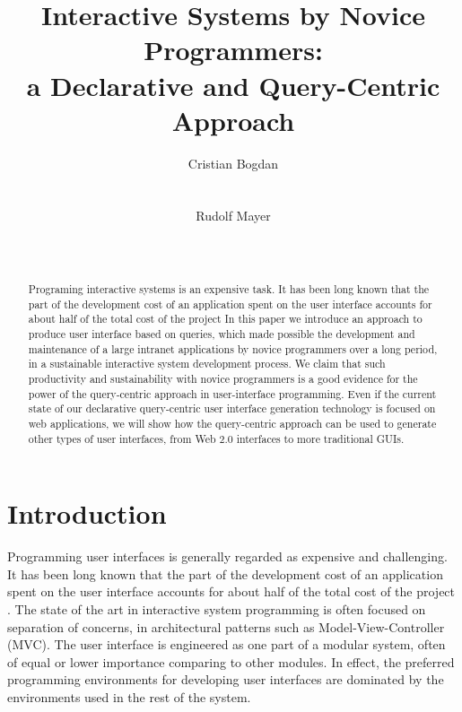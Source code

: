 \documentclass{chi2009}
\begin{document}
\title{Interactive Systems by Novice Programmers:\\ a Declarative and Query-Centric Approach}

\author{
  \alignauthor Cristian Bogdan\\
    \\
    \\
  \alignauthor Rudolf Mayer\\
    \\
    \\
}

\maketitle
\begin{abstract}
Programing interactive systems is an expensive task. It has been long known that the part of the development cost of an application spent on the user interface accounts for 
about half
of the total cost of the project 
In this paper we introduce an approach to produce user interface based on queries, which made possible the development and maintenance of a large intranet applications by novice programmers over a long period, in 
a sustainable interactive system development process. We claim that such productivity and sustainability with novice programmers is a good evidence for the power of the query-centric approach in user-interface programming. Even if the current state of our declarative query-centric user interface generation technology 
is focused on web applications, we will show how the query-centric approach can be used to generate other types of user interfaces, from Web 2.0 interfaces to more traditional GUIs.
\end{abstract}

\section{Introduction}\label{sec:intro}
Programming user interfaces is generally regarded as expensive and challenging.  It has been long known that the part of the development cost of an application spent on the user interface accounts for about half of the total cost of the project \cite{Myers92surveyon}. The state of the art in interactive system programming is often focused on separation of concerns, in architectural patterns such as Model-View-Controller (MVC). The user interface is engineered as one part of a modular system, often of equal or lower importance comparing to other modules. In effect, the preferred programming environments for developing user interfaces are dominated by the environments used in the rest of the system.
\end{document}
